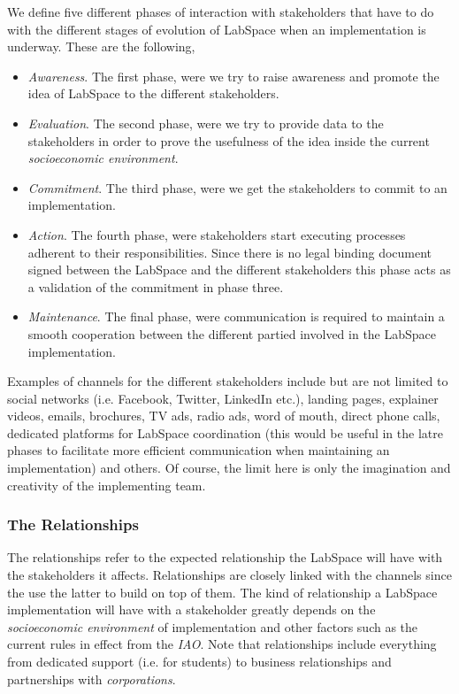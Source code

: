 \documentclass[a4paper, 11pt]{article}
\begin{document}
We define five different phases of interaction with stakeholders that have to do with the different stages of evolution of LabSpace when an implementation is underway. These are the following,

\begin{itemize}[noitemsep]
    \item \textit{Awareness}. The first phase, were we try to raise awareness and promote the idea of LabSpace to the different stakeholders.
    \item \textit{Evaluation}. The second phase, were we try to provide data to the stakeholders in order to prove the usefulness of the idea inside the current \textit{socioeconomic environment}.
    \item \textit{Commitment}. The third phase, were we get the stakeholders to commit to an implementation.
    \item \textit{Action}. The fourth phase, were stakeholders start executing processes adherent to their responsibilities. Since there is no legal binding document signed between the LabSpace and the different stakeholders this phase acts as a validation of the commitment in phase three.
    \item \textit{Maintenance}. The final phase, were communication is required to maintain a smooth cooperation between the different partied involved in the LabSpace implementation.
\end{itemize}

Examples of channels for the different stakeholders include but are not limited to social networks (i.e. Facebook, Twitter, LinkedIn etc.), landing pages, explainer videos, emails, brochures, TV ads, radio ads, word of mouth, direct phone calls, dedicated platforms for LabSpace coordination (this would be useful in the latre phases to facilitate more efficient communication when maintaining an implementation) and others. Of course, the limit here is only the imagination and creativity of the implementing team.

\subsubsection{The Relationships}

The relationships refer to the expected relationship the LabSpace will have with the stakeholders it affects. Relationships are closely linked with the channels since the use the latter to build on top of them. The kind of relationship a LabSpace implementation will have with a stakeholder greatly depends on the \textit{socioeconomic environment} of implementation and other factors such as the current rules in effect from the \textit{IAO}. Note that relationships include everything from dedicated support (i.e. for students) to business relationships and partnerships with \textit{corporations}.
\end{document}
